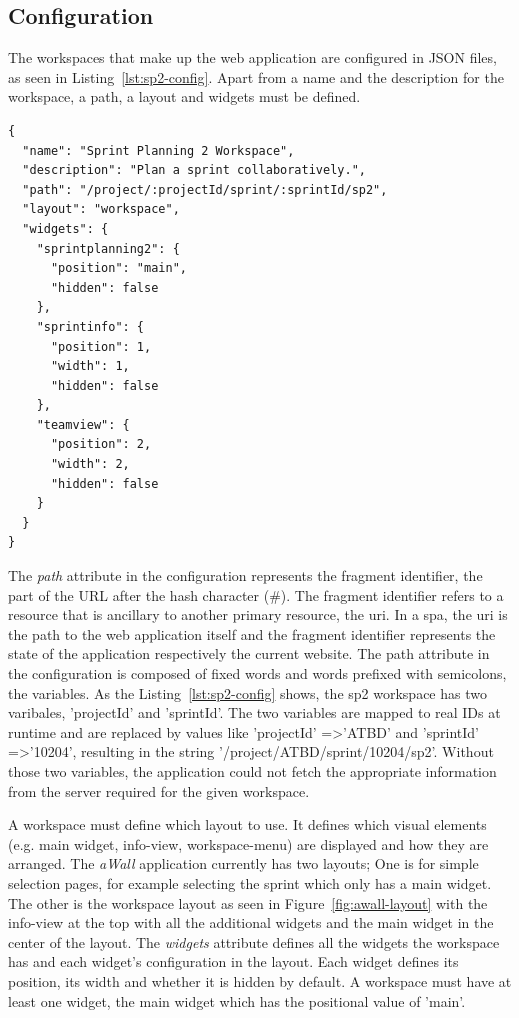 \documentclass{sigchi}
\begin{document}
\subsection{Configuration}

The workspaces that make up the web application are configured in JSON files, as seen in Listing~\ref{lst:sp2-config}. 
Apart from a name and the description for the workspace, a path, a layout and widgets must be defined. 

\begin{lstlisting}
{
  "name": "Sprint Planning 2 Workspace",
  "description": "Plan a sprint collaboratively.",
  "path": "/project/:projectId/sprint/:sprintId/sp2",
  "layout": "workspace",
  "widgets": {
    "sprintplanning2": {
      "position": "main",
      "hidden": false
    },
    "sprintinfo": {
      "position": 1,
      "width": 1,
      "hidden": false
    },
    "teamview": {
      "position": 2,
      "width": 2,
      "hidden": false
    }
  }
}
\end{lstlisting}


The \textit{path} attribute in the configuration represents the fragment identifier, the part of the URL after the hash character (\#).
The fragment identifier refers to a resource that is ancillary to another primary resource, the \gls{uri}.
In a \gls{spa}, the \gls{uri} is the path to the web application itself and the fragment identifier represents the state of the application respectively the current website.
The path attribute in the configuration is composed of fixed words and words prefixed with semicolons, the variables.
As the Listing~\ref{lst:sp2-config} shows, the \gls{sp2} workspace has two varibales, 'projectId' and 'sprintId'.
The two variables are mapped to real IDs at runtime and are replaced by values like 'projectId' =\textgreater 'ATBD' and 'sprintId' =\textgreater '10204', resulting in the string '/project/ATBD/sprint/10204/sp2'.
Without those two variables, the application could not fetch the appropriate information from the server required for the given workspace.

A workspace must define which layout to use.
It defines which visual elements (e.g. main widget, info-view, workspace-menu) are displayed and how they are arranged.
The \textit{aWall} application currently has two layouts; One is for simple selection pages, for example selecting the sprint which only has a main widget.
The other is the workspace layout as seen in Figure~\ref{fig:awall-layout} with the info-view at the top with all the additional widgets and the main widget in the center of the layout.
The \textit{widgets} attribute defines all the widgets the workspace has and each widget's configuration in the layout.
Each widget defines its position, its width and whether it is hidden by default.
A workspace must have at least one widget, the main widget which has the positional value of 'main'.
\end{document}
